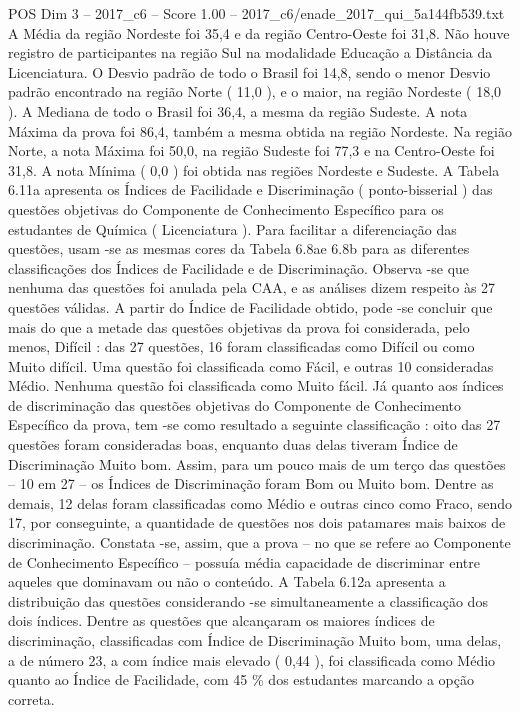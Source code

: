 \begin{textsample}{POS Dim 3 – 2017\_c6 – Score 1.00 – 2017\_c6/enade\_2017\_qui\_5a144fb539.txt}
A Média da região Nordeste foi 35,4 e da região Centro-Oeste foi 31,8.
Não houve registro de participantes na região Sul na modalidade Educação a Distância da Licenciatura.
O Desvio padrão de todo o Brasil foi 14,8, sendo o menor Desvio padrão encontrado na região Norte ( 11,0 ), e o maior, na região Nordeste ( 18,0 ).
A Mediana de todo o Brasil foi 36,4, a mesma da região Sudeste.
A nota Máxima da prova foi 86,4, também a mesma obtida na região Nordeste.
Na região Norte, a nota Máxima foi 50,0, na região Sudeste foi 77,3 e na Centro-Oeste foi 31,8.
A nota Mínima ( 0,0 ) foi obtida nas regiões Nordeste e Sudeste.
A Tabela 6.11a apresenta os Índices de Facilidade e Discriminação ( ponto-bisserial ) das questões objetivas do Componente de Conhecimento Específico para os estudantes de Química ( Licenciatura ).
Para facilitar a diferenciação das questões, usam -se as mesmas cores da Tabela 6.8ae 6.8b para as diferentes classificações dos Índices de Facilidade e de Discriminação.
Observa -se que nenhuma das questões foi anulada pela CAA, e as análises dizem respeito às 27 questões válidas.
A partir do Índice de Facilidade obtido, pode -se concluir que mais do que a metade das questões objetivas da prova foi considerada, pelo menos, Difícil : das 27 questões, 16 foram classificadas como Difícil ou como Muito difícil.
Uma questão foi classificada como Fácil, e outras 10 consideradas Médio.
Nenhuma questão foi classificada como Muito fácil.
Já quanto aos índices de discriminação das questões objetivas do Componente de Conhecimento Específico da prova, tem -se como resultado a seguinte classificação : oito das 27 questões foram consideradas boas, enquanto duas delas tiveram Índice de Discriminação Muito bom.
Assim, para um pouco mais de um terço das questões – 10 em 27 – os Índices de Discriminação foram Bom ou Muito bom.
Dentre as demais, 12 delas foram classificadas como Médio e outras cinco como Fraco, sendo 17, por conseguinte, a quantidade de questões nos dois patamares mais baixos de discriminação.
Constata -se, assim, que a prova – no que se refere ao Componente de Conhecimento Específico – possuía média capacidade de discriminar entre aqueles que dominavam ou não o conteúdo.
A Tabela 6.12a apresenta a distribuição das questões considerando -se simultaneamente a classificação dos dois índices.
Dentre as questões que alcançaram os maiores índices de discriminação, classificadas com Índice de Discriminação Muito bom, uma delas, a de número 23, a com índice mais elevado ( 0,44 ), foi classificada como Médio quanto ao Índice de Facilidade, com 45 \% dos estudantes marcando a opção correta.

\end{textsample}
